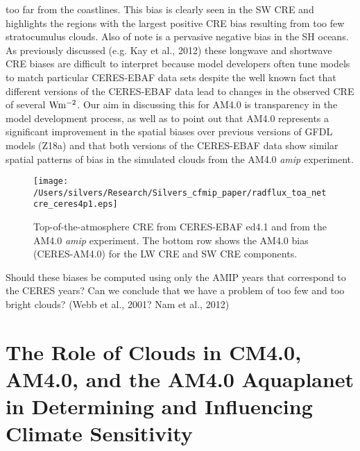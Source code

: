 \documentclass[draft]{agujournal2019}
\begin{document}
too far from the coastlines. 
This bias is clearly seen in the SW CRE and highlights the regions with the largest
positive CRE bias resulting from too few stratocumulus clouds.  Also of note is a pervasive negative bias in the SH oceans.   
  As previously discussed (e.g. Kay et al., 2012) these longwave and shortwave CRE 
biases are difficult to interpret because model developers often tune models to match particular CERES-EBAF data 
sets despite the well known fact that different versions of the CERES-EBAF data lead to changes in the observed CRE of
several $\rm{W m^{-2}}$.   Our aim in discussing this for AM4.0 is transparency in the model development process, 
as well as to point out that AM4.0 represents a significant improvement in the spatial biases over previous versions
of GFDL models (Z18a) and that both versions of the CERES-EBAF data show similar spatial patterns of bias in the 
simulated clouds  from the AM4.0 \textit{amip} experiment.   

\begin{figure}
  \centering
  \texttt{[image: /Users/silvers/Research/Silvers\_cfmip\_paper/radflux\_toa\_netcre\_ceres4p1.eps]}
  \caption{Top-of-the-atmosphere CRE from CERES-EBAF ed4.1 and from the AM4.0 \textit{amip} experiment.  
  The bottom row shows the AM4.0 bias (CERES-AM4.0) for the LW CRE and SW CRE components.}
  \label{fig:ceres_cre_4p1}
\end{figure}

Should these biases be computed using only the AMIP years that 
correspond to the CERES years? 
Can we conclude that we have a problem of too few and too bright clouds?   (Webb et al., 2001? Nam et al., 2012)



\section{The Role of Clouds in CM4.0, AM4.0, and the AM4.0 Aquaplanet in Determining and Influencing Climate Sensitivity}

\end{document}
